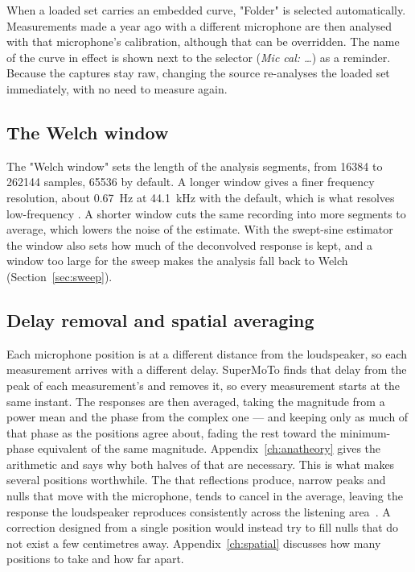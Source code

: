\noindent When a loaded set carries an embedded curve, "Folder" is selected automatically. Measurements made a year ago with a different microphone are then analysed with that microphone's calibration, although that can be overridden. The name of the curve in effect is shown next to the selector (\textit{Mic cal: \ldots}) as a reminder. Because the captures stay raw, changing the source re-analyses the loaded set immediately, with no need to measure again.

\subsection{The Welch window}
The "Welch window" sets the length of the analysis segments, from 16384 to 262144 samples, 65536 by default. A longer window gives a finer frequency resolution, about \SI{0.67}{\hertz} at \SI{44.1}{\kilo\hertz} with the default, which is what resolves low-frequency . A shorter window cuts the same recording into more segments to average, which lowers the noise of the estimate. With the swept-sine estimator the window also sets how much of the deconvolved response is kept, and a window too large for the sweep makes the analysis fall back to Welch (Section~\ref{sec:sweep}).

\subsection{Delay removal and spatial averaging}\label{sec:spatialavg}
Each microphone position is at a different distance from the loudspeaker, so each measurement arrives with a different delay. SuperMoTo finds that delay from the peak of each measurement's  and removes it, so every measurement starts at the same instant. The responses are then averaged, taking the magnitude from a power mean and the phase from the complex one --- and keeping only as much of that phase as the positions agree about, fading the rest toward the minimum-phase equivalent of the same magnitude. Appendix~\ref{ch:anatheory} gives the arithmetic and says why both halves of that are necessary. This  is what makes several positions worthwhile. The  that reflections produce, narrow peaks and nulls that move with the microphone, tends to cancel in the average, leaving the response the loudspeaker reproduces consistently across the listening area~\cite{Toole,Mourjopoulos1994}. A correction designed from a single position would instead try to fill nulls that do not exist a few centimetres away. Appendix~\ref{ch:spatial} discusses how many positions to take and how far apart.

